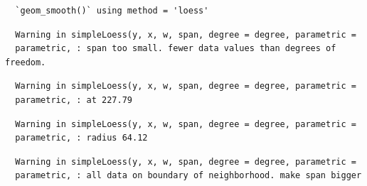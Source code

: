 \documentclass[12pt,twoside]{reedthesis}
\begin{document}
  \begin{Shaded}
  \begin{Highlighting}[]
  \NormalTok{(}\OperatorTok{+}\StringTok{ }\NormalTok{()}\OperatorTok{+}\StringTok{ }\NormalTok{(}\OperatorTok{~}\StringTok{ }\OperatorTok{+}\StringTok{ }\NormalTok{()}\OperatorTok{+}\NormalTok{()}\OperatorTok{+}\NormalTok{(} \NormalTok{(} \NormalTok{, } \NormalTok{), } \NormalTok{(} \NormalTok{), } \NormalTok{(}\NormalTok{), }\NormalTok{(} \NormalTok{,} \NormalTok{), } \NormalTok{)}\OperatorTok{+}\StringTok{ }\NormalTok{()}
  \end{Highlighting}
  \end{Shaded}
  
  \begin{verbatim}
  `geom_smooth()` using method = 'loess'
  \end{verbatim}
  
  \begin{verbatim}
  Warning in simpleLoess(y, x, w, span, degree = degree, parametric =
  parametric, : span too small. fewer data values than degrees of freedom.
  \end{verbatim}
  
  \begin{verbatim}
  Warning in simpleLoess(y, x, w, span, degree = degree, parametric =
  parametric, : at 227.79
  \end{verbatim}
  
  \begin{verbatim}
  Warning in simpleLoess(y, x, w, span, degree = degree, parametric =
  parametric, : radius 64.12
  \end{verbatim}
  
  \begin{verbatim}
  Warning in simpleLoess(y, x, w, span, degree = degree, parametric =
  parametric, : all data on boundary of neighborhood. make span bigger
  \end{verbatim}
  
\end{document}
